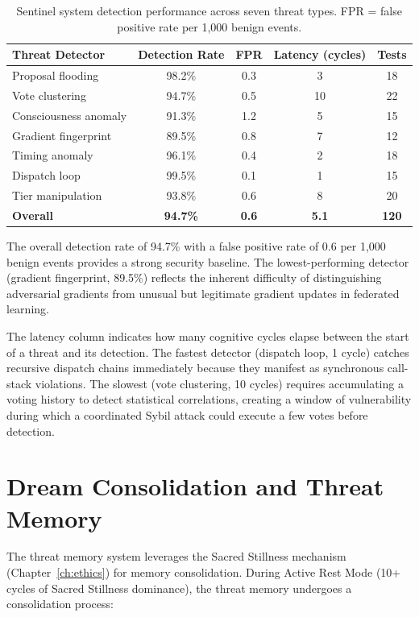 \documentclass[12pt]{book}
\begin{document}
\begin{table}[H]
\centering
\caption{Sentinel system detection performance across seven threat types. FPR = false positive rate per 1,000 benign events.}
\label{tab:sentinel-performance}
\begin{tabular}{lcccc}
\toprule
\textbf{Threat Detector} & \textbf{Detection Rate} & \textbf{FPR} & \textbf{Latency (cycles)} & \textbf{Tests} \\
\midrule
Proposal flooding & 98.2\% & 0.3 & 3 & 18 \\
Vote clustering & 94.7\% & 0.5 & 10 & 22 \\
Consciousness anomaly & 91.3\% & 1.2 & 5 & 15 \\
Gradient fingerprint & 89.5\% & 0.8 & 7 & 12 \\
Timing anomaly & 96.1\% & 0.4 & 2 & 18 \\
Dispatch loop & 99.5\% & 0.1 & 1 & 15 \\
Tier manipulation & 93.8\% & 0.6 & 8 & 20 \\
\midrule
\textbf{Overall} & \textbf{94.7\%} & \textbf{0.6} & \textbf{5.1} & \textbf{120} \\
\bottomrule
\end{tabular}
\end{table}

The overall detection rate of 94.7\% with a false positive rate of 0.6 per 1,000 benign events provides a strong security baseline. The lowest-performing detector (gradient fingerprint, 89.5\%) reflects the inherent difficulty of distinguishing adversarial gradients from unusual but legitimate gradient updates in federated learning.

The latency column indicates how many cognitive cycles elapse between the start of a threat and its detection. The fastest detector (dispatch loop, 1 cycle) catches recursive dispatch chains immediately because they manifest as synchronous call-stack violations. The slowest (vote clustering, 10 cycles) requires accumulating a voting history to detect statistical correlations, creating a window of vulnerability during which a coordinated Sybil attack could execute a few votes before detection.

\section{Dream Consolidation and Threat Memory}

The threat memory system leverages the Sacred Stillness mechanism (Chapter~\ref{ch:ethics}) for memory consolidation. During Active Rest Mode (10+ cycles of Sacred Stillness dominance), the threat memory undergoes a consolidation process:
\end{document}
